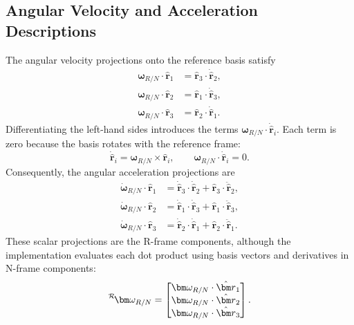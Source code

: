 \subsection{Angular Velocity and Acceleration Descriptions}
The angular velocity projections onto the reference basis satisfy
\begin{subequations}
    \begin{align}
        \bm\omega_{R/N}\cdot\hat{\bm r}_1 &= \hat{\bm r}_3\cdot\dot{\hat{\bm r}}_2, \\
        \bm\omega_{R/N}\cdot\hat{\bm r}_2 &= \hat{\bm r}_1\cdot\dot{\hat{\bm r}}_3, \\
        \bm\omega_{R/N}\cdot\hat{\bm r}_3 &= \hat{\bm r}_2\cdot\dot{\hat{\bm r}}_1.
    \end{align}
\end{subequations}
Differentiating the left-hand sides introduces the terms
$\bm\omega_{R/N}\cdot\dot{\hat{\bm r}}_i$. Each term is zero because the basis rotates with the reference frame:
\[
    \dot{\hat{\bm r}}_i=\bm\omega_{R/N}\times\hat{\bm r}_i,
    \qquad
    \bm\omega_{R/N}\cdot\dot{\hat{\bm r}}_i=0.
\]
Consequently, the angular acceleration projections are
\begin{subequations}
    \begin{align}
        \dot{\bm\omega}_{R/N}\cdot\hat{\bm r}_1
            &= \dot{\hat{\bm r}}_3\cdot\dot{\hat{\bm r}}_2
               +\hat{\bm r}_3\cdot\ddot{\hat{\bm r}}_2, \\
        \dot{\bm\omega}_{R/N}\cdot\hat{\bm r}_2
            &= \dot{\hat{\bm r}}_1\cdot\dot{\hat{\bm r}}_3
               +\hat{\bm r}_1\cdot\ddot{\hat{\bm r}}_3, \\
        \dot{\bm\omega}_{R/N}\cdot\hat{\bm r}_3
            &= \dot{\hat{\bm r}}_2\cdot\dot{\hat{\bm r}}_1
               +\hat{\bm r}_2\cdot\ddot{\hat{\bm r}}_1.
    \end{align}
\end{subequations}
These scalar projections are the R-frame components, although the implementation evaluates each dot product using basis vectors and derivatives in N-frame components:
\begin{equation}
    \leftexp{R}{\bm\omega_{R/N}} =
    \begin{bmatrix}
        \bm\omega_{R/N}\cdot\hat{\bm r}_1 \\
        \bm\omega_{R/N}\cdot\hat{\bm r}_2 \\
        \bm\omega_{R/N}\cdot\hat{\bm r}_3
    \end{bmatrix}.
\end{equation}
